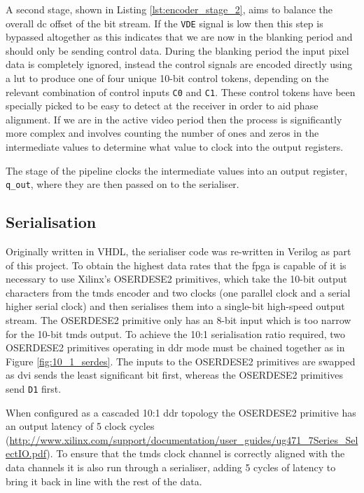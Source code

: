 A second stage, shown in Listing \ref{lst:encoder_stage_2}, aims to balance the overall \gls{dc} offset of the bit stream. If the \texttt{VDE} signal is low then this step is bypassed altogether as this indicates that we are now in the blanking period and should only be sending control data. During the blanking period the input pixel data is completely ignored, instead the control signals are encoded directly using a \gls{lut} to produce one of four unique 10-bit control tokens, depending on the relevant combination of control inputs \texttt{C0} and \texttt{C1}. These control tokens have been specially picked to be easy to detect at the receiver in order to aid phase alignment. If we are in the active video period then the process is significantly more complex and involves counting the number of ones and zeros in the intermediate values to determine what value to clock into the output registers.

The stage of the pipeline clocks the intermediate values into an output register, \texttt{q\_out}, where they are then passed on to the serialiser.

\subsection{Serialisation}

Originally written in VHDL, the serialiser code was re-written in Verilog as part of this project. To obtain the highest data rates that the \gls{fpga} is capable of it is necessary to use Xilinx's OSERDESE2 primitives, which take the 10-bit output characters from the \gls{tmds} encoder and two clocks (one parallel clock and a serial higher serial clock) and then serialises them into a single-bit high-speed output stream. The OSERDESE2 primitive only has an 8-bit input which is too narrow for the 10-bit \gls{tmds} output. To achieve the 10:1 serialisation ratio required, two OSERDESE2 primitives operating in \gls{ddr} mode must be chained together as in Figure \ref{fig:10_1_serdes}. The inputs to the OSERDESE2 primitives are swapped as \gls{dvi} sends the least significant bit first, whereas the OSERDESE2 primitives send \texttt{D1} first.

When configured as a cascaded 10:1 \gls{ddr} topology the OSERDESE2 primitive has an output latency of 5 clock cycles (\url{http://www.xilinx.com/support/documentation/user_guides/ug471_7Series_SelectIO.pdf}). To ensure that the \gls{tmds} clock channel is correctly aligned with the data channels it is also run through a serialiser, adding 5 cycles of latency to bring it back in line with the rest of the data.

